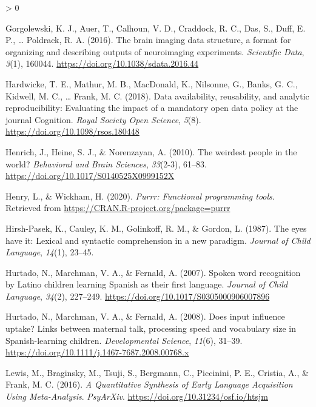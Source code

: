 \documentclass[
  english,
  man,floatsintext]{apa6}
\newlength{\cslhangindent}
\newenvironment{CSLReferences}[2] %
 {%
  \setlength{\parindent}{0pt}
  \ifodd #1 \everypar{\setlength{\hangindent}{\cslhangindent}}\ignorespaces\fi
  \ifnum #2 > 0
  \setlength{\parskip}{#2\baselineskip}
  \fi
 }%
 {}
\begin{document}
\begin{CSLReferences}{1}{0}
\leavevmode\hypertarget{ref-gorgolewski_brain_2016}{}%
Gorgolewski, K. J., Auer, T., Calhoun, V. D., Craddock, R. C., Das, S., Duff, E. P., \ldots{} Poldrack, R. A. (2016). The brain imaging data structure, a format for organizing and describing outputs of neuroimaging experiments. \emph{Scientific Data}, \emph{3}(1), 160044. \url{https://doi.org/10.1038/sdata.2016.44}

\leavevmode\hypertarget{ref-hardwicke2018}{}%
Hardwicke, T. E., Mathur, M. B., MacDonald, K., Nilsonne, G., Banks, G. C., Kidwell, M. C., \ldots{} Frank, M. C. (2018). {Data availability, reusability, and analytic reproducibility: Evaluating the impact of a mandatory open data policy at the journal Cognition}. \emph{Royal Society Open Science}, \emph{5}(8). \url{https://doi.org/10.1098/rsos.180448}

\leavevmode\hypertarget{ref-Henrich2010}{}%
Henrich, J., Heine, S. J., \& Norenzayan, A. (2010). {The weirdest people in the world?} \emph{Behavioral and Brain Sciences}, \emph{33}(2-3), 61--83. \url{https://doi.org/10.1017/S0140525X0999152X}

\leavevmode\hypertarget{ref-R-purrr}{}%
Henry, L., \& Wickham, H. (2020). \emph{Purrr: Functional programming tools}. Retrieved from \url{https://CRAN.R-project.org/package=purrr}

\leavevmode\hypertarget{ref-hirshpasek1987}{}%
Hirsh-Pasek, K., Cauley, K. M., Golinkoff, R. M., \& Gordon, L. (1987). {The eyes have it: Lexical and syntactic comprehension in a new paradigm}. \emph{Journal of Child Language}, \emph{14}(1), 23--45.

\leavevmode\hypertarget{ref-Hurtado2007}{}%
Hurtado, N., Marchman, V. A., \& Fernald, A. (2007). {Spoken word recognition by Latino children learning Spanish as their first language}. \emph{Journal of Child Language}, \emph{34}(2), 227--249. \url{https://doi.org/10.1017/S0305000906007896}

\leavevmode\hypertarget{ref-Hurtado2008}{}%
Hurtado, N., Marchman, V. A., \& Fernald, A. (2008). {Does input influence uptake? Links between maternal talk, processing speed and vocabulary size in Spanish-learning children}. \emph{Developmental Science}, \emph{11}(6), 31--39. \url{https://doi.org/10.1111/j.1467-7687.2008.00768.x}

\leavevmode\hypertarget{ref-Lewis2016}{}%
Lewis, M., Braginsky, M., Tsuji, S., Bergmann, C., Piccinini, P. E., Cristia, A., \& Frank, M. C. (2016). \emph{{A Quantitative Synthesis of Early Language Acquisition Using Meta-Analysis}}. \emph{PsyArXiv}. \url{https://doi.org/10.31234/osf.io/htsjm}


\end{CSLReferences}
\end{document}
